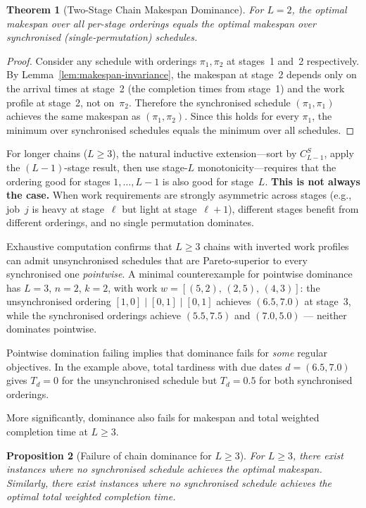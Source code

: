\documentclass[11pt,titlepage]{article}
\newtheorem{theorem}{Theorem}
\newtheorem{proposition}[theorem]{Proposition}
\begin{document}
\begin{theorem}[Two-Stage Chain Makespan Dominance]
\label{thm:chain-l2}
For $L = 2$, the optimal makespan over all per-stage
orderings equals the optimal makespan over synchronised
(single-permutation) schedules.
\end{theorem}

\begin{proof}
Consider any schedule with orderings $\pi_1, \pi_2$ at
stages~1 and~2 respectively. By
Lemma~\ref{lem:makespan-invariance}, the makespan at
stage~2 depends only on the arrival times at stage~2 (the
completion times from stage~1) and the work profile at
stage~2, not on~$\pi_2$. Therefore the synchronised schedule
$(\pi_1, \pi_1)$ achieves the same makespan as $(\pi_1,
\pi_2)$. Since this holds for every $\pi_1$, the minimum
over synchronised schedules equals the minimum over all
schedules.
\end{proof}

For longer chains ($L \geq 3$), the natural inductive
extension---sort by $C_{L-1}^S$, apply the $(L{-}1)$-stage
result, then use stage-$L$ monotonicity---requires that the
ordering good for stages $1, \ldots, L{-}1$ is also good for
stage~$L$. \textbf{This is not always the case.} When work
requirements are strongly asymmetric across stages (e.g.,
job~$j$ is heavy at stage~$\ell$ but light at
stage~$\ell{+}1$), different stages benefit from
different orderings, and no single permutation dominates.

Exhaustive computation confirms that $L \geq 3$ chains
with inverted work profiles can admit unsynchronised
schedules that are Pareto-superior to every synchronised
one \emph{pointwise}. A minimal counterexample for
pointwise dominance has $L = 3$, $n = 2$, $k = 2$, with
work $w = [(5,2),\,(2,5),\,(4,3)]$: the unsynchronised
ordering $[1,0] \mid [0,1] \mid [0,1]$ achieves
$(6.5, 7.0)$ at stage~3, while the synchronised orderings
achieve $(5.5, 7.5)$ and $(7.0, 5.0)$ --- neither dominates
pointwise.

Pointwise domination failing implies that dominance fails
for \emph{some} regular objectives. In the example above,
total tardiness with due dates $d = (6.5, 7.0)$ gives
$T_d = 0$ for the unsynchronised schedule but $T_d = 0.5$
for both synchronised orderings.

More significantly, dominance also fails for makespan
and total weighted completion time at $L \geq 3$.

\begin{proposition}[Failure of chain dominance for $L \geq 3$]
\label{prop:chain-failure}
For $L \geq 3$, there exist instances where no synchronised
schedule achieves the optimal makespan. Similarly, there
exist instances where no synchronised schedule achieves the
optimal total weighted completion time.
\end{proposition}
\end{document}
